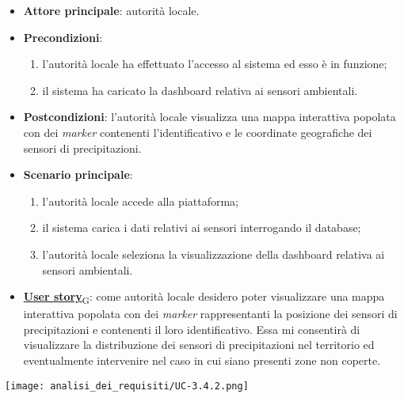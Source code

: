 \begin{itemize}
	\item \textbf{Attore principale}: autorità locale.
	\item \textbf{Precondizioni}:
	      \begin{enumerate}
		      \item l'autorità locale ha effettuato l'accesso al sistema ed esso è in funzione;
		      \item il sistema ha caricato la dashboard relativa ai sensori ambientali.
	      \end{enumerate}
	\item \textbf{Postcondizioni}: l'autorità locale visualizza una mappa interattiva popolata con dei \textit{marker} contenenti l'identificativo e le coordinate geografiche dei sensori di precipitazioni.
	\item \textbf{Scenario principale}:
	      \begin{enumerate}
		      \item l'autorità locale accede alla piattaforma;
		      \item il sistema carica i dati relativi ai sensori interrogando il database;
		      \item l'autorità locale seleziona la visualizzazione della dashboard relativa ai sensori ambientali.
	      \end{enumerate}
	\item \href{https://7last.github.io/docs/pb/documentazione-interna/glossario\#user-story}{\textbf{User story}\textsubscript{G}}:
	      come autorità locale desidero poter visualizzare una mappa interattiva popolata con dei \textit{marker} rappresentanti la posizione dei sensori di precipitazioni
	      e contenenti il loro identificativo. Essa mi consentirà di visualizzare la distribuzione dei sensori di precipitazioni nel territorio ed
	      eventualmente intervenire nel caso in cui siano presenti zone non coperte.
\end{itemize}
\begin{center}
	\texttt{[image: analisi\_dei\_requisiti/UC-3.4.2.png]}
\end{center}


